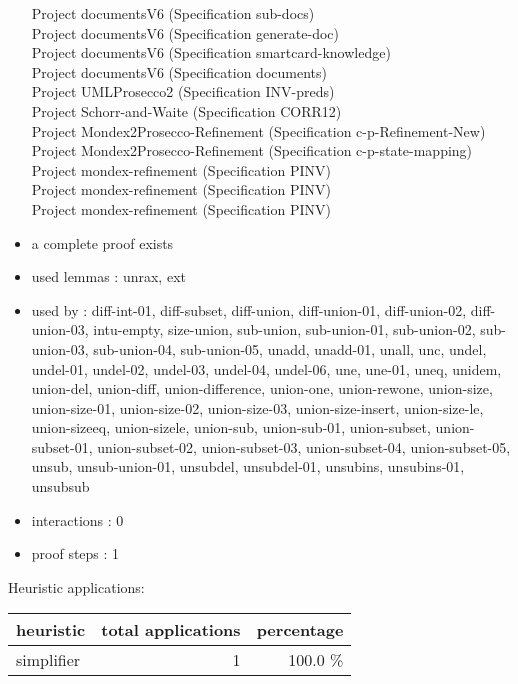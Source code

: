 \documentclass[a4paper]{article}
\begin{document}
\begin{itemize}
Project documentsV6 (Specification sub-docs) \\
Project documentsV6 (Specification generate-doc) \\
Project documentsV6 (Specification smartcard-knowledge) \\
Project documentsV6 (Specification documents) \\
Project UMLProsecco2 (Specification INV-preds) \\
Project Schorr-and-Waite (Specification CORR12) \\
Project Mondex2Prosecco-Refinement (Specification c-p-Refinement-New) \\
Project Mondex2Prosecco-Refinement (Specification c-p-state-mapping) \\
Project mondex-refinement (Specification PINV) \\
Project mondex-refinement (Specification PINV) \\
Project mondex-refinement (Specification PINV)
\item       a complete proof exists
\item       used lemmas  : unrax, ext
\item       used by      : diff-int-01, diff-subset, diff-union, diff-union-01, diff-union-02, diff-union-03, intu-empty, size-union, sub-union, sub-union-01, sub-union-02, sub-union-03, sub-union-04, sub-union-05, unadd, unadd-01, unall, unc, undel, undel-01, undel-02, undel-03, undel-04, undel-06, une, une-01, uneq, unidem, union-del, union-diff, union-difference, union-one, union-rewone, union-size, union-size-01, union-size-02, union-size-03, union-size-insert, union-size-le, union-sizeeq, union-sizele, union-sub, union-sub-01, union-subset, union-subset-01, union-subset-02, union-subset-03, union-subset-04, union-subset-05, unsub, unsub-union-01, unsubdel, unsubdel-01, unsubins, unsubins-01, unsubsub
\item       interactions : 0
\item       proof steps  : 1
\end{itemize}

\medskip


Heuristic applications:

\begin{supertabular}{l|r|r}
heuristic	& total applications & percentage \\ \hline
simplifier & 1 & 100.0 \% \\

\end{supertabular}
\end{document}
